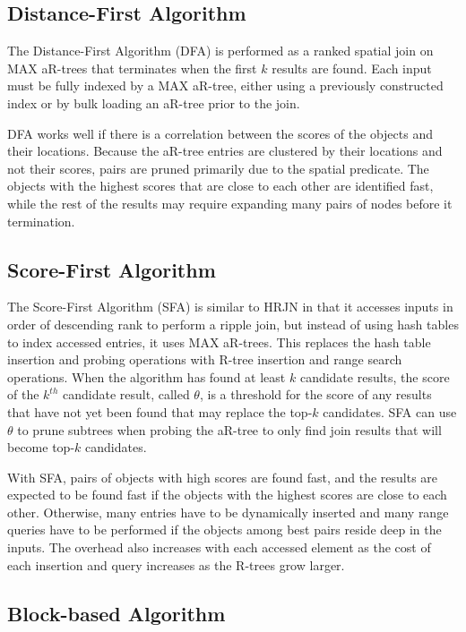 \subsection{Distance-First Algorithm}

The Distance-First Algorithm (DFA) is performed as a ranked spatial join on MAX aR-trees that terminates when the first \(k\) results are found. Each input must be fully indexed by a MAX aR-tree, either using a previously constructed index or by bulk loading an aR-tree prior to the join.

DFA works well if there is a correlation between the scores of the objects and their locations. Because the aR-tree entries are clustered by their locations and not their scores, pairs are pruned primarily due to the spatial predicate. The objects with the highest scores that are close to each other are identified fast, while the rest of the results may require expanding many pairs of nodes before it termination.

\subsection{Score-First Algorithm}

The Score-First Algorithm (SFA) is similar to HRJN in that it accesses inputs in order of descending rank to perform a ripple join, but instead of using hash tables to index accessed entries, it uses MAX aR-trees. This replaces the hash table insertion and probing operations with R-tree insertion and range search operations. When the algorithm has found at least \(k\) candidate results, the score of the \(k^{th}\) candidate result, called \(\theta\), is a threshold for the score of any results that have not yet been found that may replace the top-\(k\) candidates. SFA can use \(\theta\) to prune subtrees when probing the aR-tree to only find join results that will become top-\(k\) candidates.

With SFA, pairs of objects with high scores are found fast, and the results are expected to be found fast if the objects with the highest scores are close to each other. Otherwise, many entries have to be dynamically inserted and many range queries have to be performed if the objects among best pairs reside deep in the inputs. The overhead also increases with each accessed element as the cost of each insertion and query increases as the R-trees grow larger.

\subsection{Block-based Algorithm}

